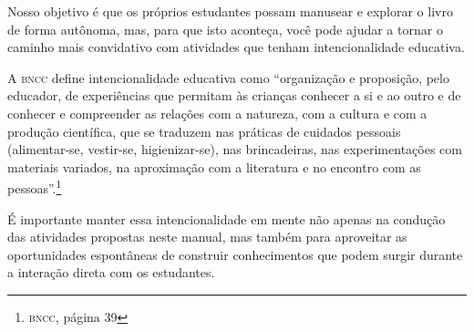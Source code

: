 \documentclass[11pt]{extarticle}
\begin{document}
Nosso objetivo é que os próprios estudantes possam manusear 
e explorar o livro de forma autônoma, mas, para que isto aconteça, você 
pode ajudar a tornar o caminho mais convidativo com atividades que tenham 
intencionalidade educativa. 

A \textsc{bncc} define intencionalidade educativa como ``organização 
e proposição, pelo educador, de experiências que permitam às crianças 
conhecer a si e ao outro e de conhecer e compreender as relações com a 
natureza, com a cultura e com a produção científica, que se traduzem nas 
práticas de cuidados pessoais (alimentar-se, vestir-se, higienizar-se), 
nas brincadeiras, nas experimentações com materiais 
variados, na aproximação com a literatura e no encontro com as 
pessoas''.\footnote{\textsc{bncc}, página 39}

É importante manter essa intencionalidade em mente não apenas na condução 
das atividades propostas neste manual, mas também para aproveitar as 
oportunidades espontâneas de construir conhecimentos que podem surgir durante 
a interação direta com os estudantes.
\end{document}
